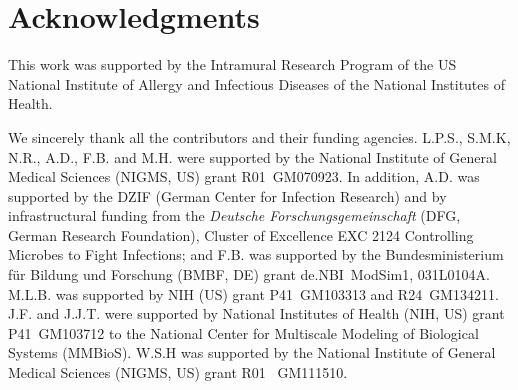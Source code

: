 
\section{Acknowledgments}


This work was supported by the Intramural Research Program of the US National Institute of Allergy and Infectious Diseases of the National Institutes of Health.

We sincerely thank all the contributors and their funding agencies. L.P.S., S.M.K, N.R., A.D., F.B. and M.H. were supported by the National Institute of General Medical Sciences (NIGMS, US) grant R01~GM070923. In addition, A.D. was supported by the DZIF (German Center for Infection Research) and by infrastructural funding from the \emph{Deutsche Forschungsgemeinschaft} (DFG, German Research Foundation), Cluster of Excellence EXC 2124 Controlling Microbes to Fight Infections; and F.B. was supported by the Bundesministerium f\"{u}r Bildung und Forschung (BMBF, DE) grant de.NBI~ModSim1, 031L0104A.
M.L.B. was supported by NIH (US) grant P41~GM103313 and R24~GM134211.
J.F. and J.J.T. were supported by National Institutes of Health (NIH, US) grant P41~GM103712 to the National Center for Multiscale Modeling of Biological Systems (MMBioS).
W.S.H was supported by the National Institute of General Medical Sciences (NIGMS, US) grant R01~ GM111510.

